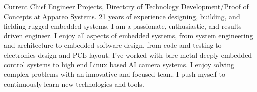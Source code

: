 

\begin{cvparagraph}

Current Chief Engineer Projects, Directory of Technology Development/Proof of Concepts at Appareo Systems. 21 years of experience designing, building, and fielding rugged embedded systems. I am a passionate, enthusiastic, and results driven engineer.
I enjoy all aspects of embedded systems, from system engineering and architecture to embedded software design, from code and testing to electronics design and PCB layout. I've worked with bare-metal deeply embedded control systems to high end Linux based AI camera systems. I enjoy solving complex problems with an innovative and focused team. I push myself to continuously learn new technologies and tools.
\end{cvparagraph}
